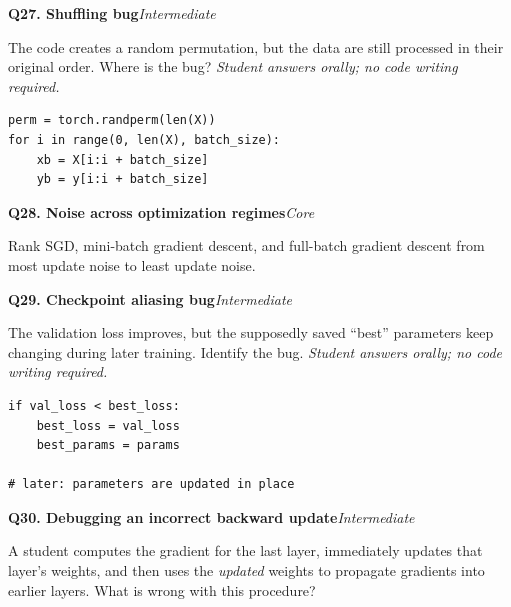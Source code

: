 \documentclass[11pt]{article}
\newif\ifshowanswers
\newenvironment{question}[3]{%
  \par\medskip
  \noindent\textbf{Q#1. #2}\hfill\textit{#3}\par\smallskip
}{\par\medskip}
\newcommand{\answer}[1]{%
  \ifshowanswers
    \begin{quote}\small\textbf{Expected answer:} #1\end{quote}
  \fi
}
\newcommand{\marking}[1]{%
  \ifshowanswers
    \begin{quote}\small\textbf{1 mark:} #1\end{quote}
  \fi
}
\newcommand{\oralnote}{\textit{Student answers orally; no code writing required.}}
\begin{document}
\begin{question}{27}{Shuffling bug}{Intermediate}
The code creates a random permutation, but the data are still processed in their original order. Where is the bug? \oralnote

\begin{lstlisting}
perm = torch.randperm(len(X))
for i in range(0, len(X), batch_size):
    xb = X[i:i + batch_size]
    yb = y[i:i + batch_size]
\end{lstlisting}

\answer{\texttt{perm} is never used. The batches must index the shuffled sample indices, for example by first applying the permutation to $X$ and $y$, or by using the appropriate slice of \texttt{perm} for indexing.}
\marking{Student identifies that generating a permutation alone does not shuffle the training samples.}
\end{question}

\begin{question}{28}{Noise across optimization regimes}{Core}
Rank SGD, mini-batch gradient descent, and full-batch gradient descent from most update noise to least update noise.

\answer{SGD is most noisy, mini-batch is intermediate, and full-batch is least noisy because each update uses the complete training set.}
\marking{Correct ordering.}
\end{question}

\begin{question}{29}{Checkpoint aliasing bug}{Intermediate}
The validation loss improves, but the supposedly saved ``best'' parameters keep changing during later training. Identify the bug. \oralnote

\begin{lstlisting}
if val_loss < best_loss:
    best_loss = val_loss
    best_params = params

# later: parameters are updated in place
\end{lstlisting}

\answer{\texttt{best\_params} refers to the same mutable parameter objects as \texttt{params}, so later in-place updates also change the saved checkpoint. The tensors must be copied/cloned when the checkpoint is stored.}
\marking{Student identifies reference/aliasing of mutable tensors and the need to store independent copies.}
\end{question}

\begin{question}{30}{Debugging an incorrect backward update}{Intermediate}
A student computes the gradient for the last layer, immediately updates that layer's weights, and then uses the \emph{updated} weights to propagate gradients into earlier layers. What is wrong with this procedure?

\answer{The backward pass is no longer computing gradients for the same parameter state used in the forward pass. Gradients should be computed first, then parameters should be updated.}
\marking{Student identifies that all gradients must correspond to the original forward-pass parameters before any update is applied.}
\end{question}
\end{document}
